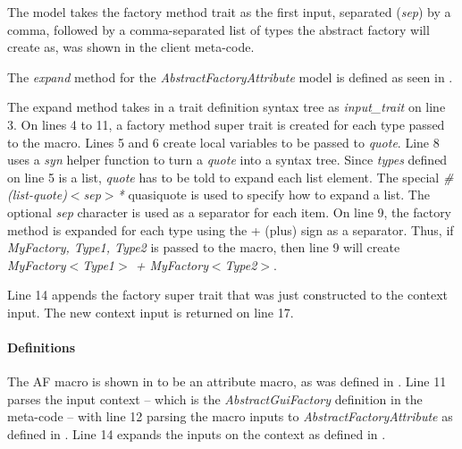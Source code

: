 
The model takes the factory method trait as the first input, separated (\textit{sep}) by a comma, followed by a comma-separated list of types the abstract factory will create as, was shown in the client meta-code.

The \textit{expand} method for the \textit{AbstractFactoryAttribute} model is defined as seen in .


The expand method takes in a trait definition syntax tree as \textit{input\_trait} on line 3.
On lines 4 to 11, a factory method super trait is created for each type passed to the macro.
Lines 5 and 6 create local variables to be passed to \textit{quote}.
Line 8 uses a \textit{syn} helper function to turn a \textit{quote} into a syntax tree.
Since \textit{types} defined on line 5 is a list, \textit{quote} has to be told to expand each list element.
The special \textit{\#(list-quote)$<$sep$>$*} quasiquote is used to specify how to expand a list.
The optional \textit{sep} character is used as a separator for each item.
On line 9, the factory method is expanded for each type using the + (plus) sign as a separator.
Thus, if \textit{MyFactory, Type1, Type2} is passed to the macro, then line 9 will create \textit{MyFactory$<$Type1$>$ + MyFactory$<$Type2$>$}.

Line 14 appends the factory super trait that was just constructed to the context input.
The new context input is returned on line 17.

\paragraph{Definitions}
The AF macro is shown in  to be an attribute macro, as was defined in .
Line 11 parses the input context -- which is the \textit{AbstractGuiFactory} definition in the meta-code -- with line 12 parsing the macro inputs to \textit{AbstractFactoryAttribute} as defined in .
Line 14 expands the inputs on the context as defined in .

